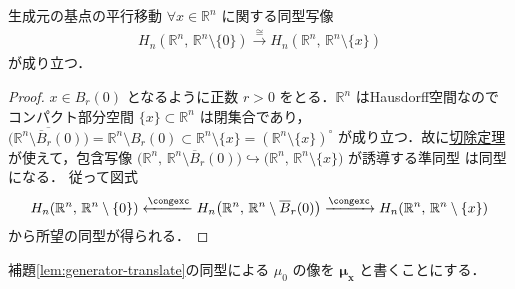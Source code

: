 \documentclass[algtopo_main]{subfiles}
\begin{document}
\begin{mylem}[label=lem:generator-translate]{生成元の基点の平行移動}
    $\forall x \in \mathbb{R}^n$ に関する同型写像
    \begin{align}
        H_n(\mathbb{R}^n,\, \mathbb{R}^n\setminus \{0\}) \xrightarrow{\cong}  H_n(\mathbb{R}^n,\, \mathbb{R}^n\setminus \{x\})
    \end{align}
    が成り立つ．
\end{mylem}

\begin{proof}
    $x \in B_r (0)$ となるように正数 $r > 0$ をとる．$\mathbb{R}^n$ はHausdorff空間なのでコンパクト部分空間 $\{x\} \subset \mathbb{R}^n$ は閉集合であり，$\overline{\bigl(\mathbb{R}^n \setminus \overline{B}_r(0)\bigr)} = \mathbb{R}^n \setminus B_r(0) \subset \mathbb{R}^n \setminus \{x\} = (\mathbb{R}^n \setminus \{x\})^\circ$ が成り立つ．故に\hyperref[thm:exc]{切除定理}が使えて，包含写像 $\bigl(\mathbb{R}^n,\, \mathbb{R}^n \setminus \overline{B}_r(0)\bigr) \hookrightarrow \bigl( \mathbb{R}^n,\, \mathbb{R}^n \setminus \{x\} \bigr)$ が誘導する準同型
    は同型になる．
    従って図式
    \begin{align}
        H_n(\mathbb{R}^n,\, \mathbb{R}^n\setminus \{0\}) \xleftarrow{\congexc} H_n \bigl(\mathbb{R}^n,\, \mathbb{R}^n \setminus \overline{B}_r(0)\bigr) \xrightarrow{\congexc}  H_n(\mathbb{R}^n,\, \mathbb{R}^n\setminus \{x\})
    \end{align}
    から所望の同型が得られる．
\end{proof}
補題\ref{lem:generator-translate}の同型による $\mu_0$ の像を $\bm{\mu_x}$ と書くことにする．
\end{document}
